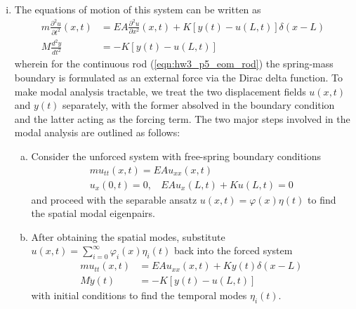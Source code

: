 \begin{enumerate}[(i)]
\item { %
    The equations of motion of this system can be written as 
    \begin{subequations}
    \begin{align}
        \label{eqn:hw3_p5_eom_rod} m \frac{\partial^2 u}{\partial t^2}(x, t) &= EA \frac{\partial^2 u}{\partial x^2}(x, t) + K \left[ y(t) - u(L, t)\right] \delta(x - L) \\
        \label{eqn:hw3_p5_eom_mass} M \frac{d^2y}{dt^2} &= -K \left[ y(t) - u(L, t)\right]
    \end{align}
    \end{subequations}
    wherein for the continuous rod (\cref{eqn:hw3_p5_eom_rod}) the spring-mass boundary is formulated as an external force via the Dirac delta function.
    To make modal analysis tractable, we treat the two displacement fields $u(x, t)$ and $y(t)$ separately, with the former absolved in the boundary condition and the latter acting as the forcing term. 
    The two major steps involved in the modal analysis are outlined as follows:
    \begin{enumerate}[(a)]
        \item {
            Consider the unforced system with free-spring boundary conditions
            \begin{equation}
            \begin{gathered}
                m u_{tt}(x, t) = EA u_{xx}(x, t) \\
                u_x(0, t) = 0, ~~~~ EAu_x(L, t) + Ku(L, t) = 0
            \end{gathered}
            \end{equation}
            and proceed with the separable ansatz $u(x, t) = \varphi(x)\eta(t)$ to find the spatial modal eigenpairs.
        }
        \item {
            After obtaining the spatial modes, substitute $u(x, t) = \sum_{i=0}^\infty \varphi_i(x)\eta_i(t)$ back into the forced system 
            \begin{equation}
            \begin{aligned}
                m u_{tt}(x, t) &= EA u_{xx}(x, t) + Ky(t)\delta(x - L) \\
                M \ddot{y}(t) &= -K \left[ y(t) - u(L, t)\right]
            \end{aligned}
            \end{equation}
            with initial conditions to find the temporal modes $\eta_i(t)$.
        }
    \end{enumerate}

}
\end{enumerate}
